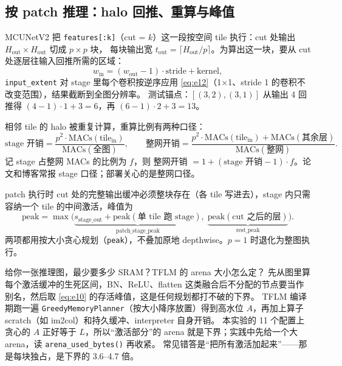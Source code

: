 \documentclass[11pt,a4paper]{ctexart}
\begin{document}
\subsection{按 patch 推理：halo 回推、重算与峰值}
MCUNetV2 把 \texttt{features[:k]}（cut = $k$）这一段按空间 tile 执行：cut 处输出 $H_\text{out}\times H_\text{out}$ 切成 $p\times p$ 块，
每块输出宽 $t_\text{out}=\lceil H_\text{out}/p\rceil$。为算出这一块，要从 cut 处逐层往输入回推所需的区域：
\begin{equation}
  w_\text{in} = (w_\text{out}-1)\cdot \text{stride} + \text{kernel} , \label{eq:e12}
\end{equation}
\texttt{input\_extent} 对 stage 里每个卷积按逆序应用 \cref{eq:e12}（1×1、stride 1 的卷积不改变范围），结果截断到全图分辨率。
测试锚点：$[(3,2),(3,1)]$ 从输出 4 回推得 $(4-1)\cdot1+3=6$，再 $(6-1)\cdot2+3=13$。

相邻 tile 的 halo 被重复计算，重算比例有两种口径：
\begin{equation}
  \text{stage 开销} = \frac{p^2\cdot \mathrm{MACs}(\text{tile}_\text{in})}{\mathrm{MACs}(\text{全图})}, \qquad
  \text{整网开销} = \frac{p^2\cdot \mathrm{MACs}(\text{tile}_\text{in}) + \mathrm{MACs}(\text{其余层})}{\mathrm{MACs}(\text{整网})} . \label{eq:e13}
\end{equation}
记 stage 占整网 MACs 的比例为 $f$，则 整网开销 $= 1 + (\text{stage 开销}-1)\cdot f$。论文和博客常报 stage 口径；部署关心的是整网口径。

patch 执行时 cut 处的完整输出缓冲必须整块存在（各 tile 写进去），stage 内只需容纳一个 tile 的中间激活，峰值为
\begin{equation}
  \text{peak} = \max\bigl(\underbrace{s_\text{stage\_out} + \mathrm{peak}(\text{单 tile 跑 stage})}_{\text{patch\_stage\_peak}},\;
  \underbrace{\mathrm{peak}(\text{cut 之后的层})}_{\text{rest\_peak}}\bigr) . \label{eq:e14}
\end{equation}
两项都用按大小贪心规划（\texttt{peak}），不叠加原地 depthwise。$p=1$ 时退化为整图执行。

\begin{iqbox}{给你一张推理图，最少要多少 SRAM？TFLM 的 arena 大小怎么定？}
先从图里算每个激活缓冲的生死区间，BN、ReLU、flatten 这类融合后不分配的节点要当作别名，然后取 \cref{eq:e10} 的存活峰值，这是任何规划都打不破的下界。
TFLM 编译期跑一遍 \texttt{GreedyMemoryPlanner}（按大小降序放置）得到高水位 $A$，再加上算子 scratch（如 im2col）和持久缓冲、interpreter 自身开销。
本实验的 11 个配置上贪心的 $A$ 正好等于 $L$，所以“激活部分”的 arena 就是下界；实践中先给一个大 arena，读 \texttt{arena\_used\_bytes()} 再收紧。
常见错答是“把所有激活加起来”——那是每块独占，是下界的 3.6--4.7 倍。
\end{iqbox}
\end{document}
